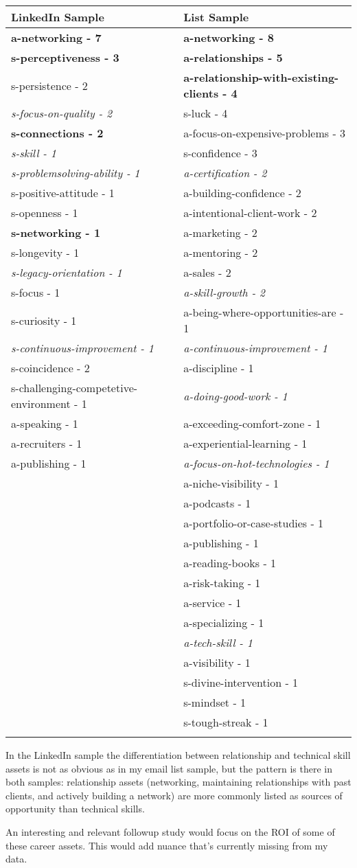 \documentclass[13pt,]{tufte-handout}
\begin{document}
\begin{longtable}[]{@{}ll@{}}
\toprule
LinkedIn Sample & List Sample\tabularnewline
\midrule
\endhead
\textbf{a-networking - 7} & \textbf{a-networking - 8}\tabularnewline
\textbf{s-perceptiveness - 3} & \textbf{a-relationships -
5}\tabularnewline
s-persistence - 2 & \textbf{a-relationship-with-existing-clients -
4}\tabularnewline
\emph{s-focus-on-quality - 2} & s-luck - 4\tabularnewline
\textbf{s-connections - 2} & a-focus-on-expensive-problems -
3\tabularnewline
\emph{s-skill - 1} & s-confidence - 3\tabularnewline
\emph{s-problemsolving-ability - 1} & \emph{a-certification -
2}\tabularnewline
s-positive-attitude - 1 & a-building-confidence - 2\tabularnewline
s-openness - 1 & a-intentional-client-work - 2\tabularnewline
\textbf{s-networking - 1} & a-marketing - 2\tabularnewline
s-longevity - 1 & a-mentoring - 2\tabularnewline
\emph{s-legacy-orientation - 1} & a-sales - 2\tabularnewline
s-focus - 1 & \emph{a-skill-growth - 2}\tabularnewline
s-curiosity - 1 & a-being-where-opportunities-are - 1\tabularnewline
\emph{s-continuous-improvement - 1} & \emph{a-continuous-improvement -
1}\tabularnewline
s-coincidence - 2 & a-discipline - 1\tabularnewline
s-challenging-competetive-environment - 1 & \emph{a-doing-good-work -
1}\tabularnewline
a-speaking - 1 & a-exceeding-comfort-zone - 1\tabularnewline
a-recruiters - 1 & a-experiential-learning - 1\tabularnewline
a-publishing - 1 & \emph{a-focus-on-hot-technologies - 1}\tabularnewline
& a-niche-visibility - 1\tabularnewline
& a-podcasts - 1\tabularnewline
& a-portfolio-or-case-studies - 1\tabularnewline
& a-publishing - 1\tabularnewline
& a-reading-books - 1\tabularnewline
& a-risk-taking - 1\tabularnewline
& a-service - 1\tabularnewline
& a-specializing - 1\tabularnewline
& \emph{a-tech-skill - 1}\tabularnewline
& a-visibility - 1\tabularnewline
& s-divine-intervention - 1\tabularnewline
& s-mindset - 1\tabularnewline
& s-tough-streak - 1\tabularnewline
 &\tabularnewline
\bottomrule
\end{longtable}

In the LinkedIn sample the differentiation between relationship and
technical skill assets is not as obvious as in my email list sample, but
the pattern is there in both samples: relationship assets (networking,
maintaining relationships with past clients, and actively building a
network) are more commonly listed as sources of opportunity than
technical skills.

An interesting and relevant followup study would focus on the ROI of
some of these career assets. This would add nuance that's currently
missing from my data.
\end{document}
